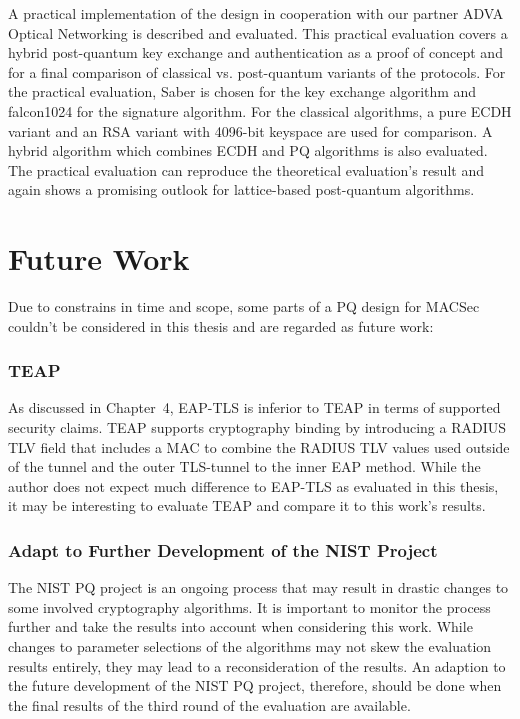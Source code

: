 A practical implementation of the design in cooperation with our partner ADVA Optical Networking is described and evaluated. This practical evaluation covers a hybrid post-quantum key exchange and authentication as a proof of concept and for a final comparison of classical vs. post-quantum variants of the protocols. For the practical evaluation, Saber is chosen for the key exchange algorithm and falcon1024 for the signature algorithm. For the classical algorithms, a pure \ac{ECDH} variant and an RSA variant with 4096-bit keyspace are used for comparison. A hybrid algorithm which combines ECDH and PQ algorithms is also evaluated. The practical evaluation can reproduce the theoretical evaluation's result and again shows a promising outlook for lattice-based post-quantum algorithms. 

\section*{Future Work}
Due to constrains in time and scope, some parts of a PQ design for MACSec couldn't be considered in this thesis and are regarded as future work:

\subsubsection*{TEAP}
    As discussed in Chapter~4, EAP-TLS is inferior to TEAP in terms of supported security claims. TEAP supports cryptography binding by introducing a RADIUS TLV field that includes a \ac{MAC} to combine the RADIUS TLV values used outside of the tunnel and the outer TLS-tunnel to the inner EAP method. While the author does not expect much difference to EAP-TLS as evaluated in this thesis, it may be interesting to evaluate TEAP and compare it to this work's results.

\subsubsection*{Adapt to Further Development of the NIST Project}
    The NIST PQ project is an ongoing process that may result in drastic changes to some involved cryptography algorithms. It is important to monitor the process further and take the results into account when considering this work. While changes to parameter selections of the algorithms may not skew the evaluation results entirely, they may lead to a reconsideration of the results. An adaption to the future development of the NIST PQ project, therefore, should be done when the final results of the third round of the evaluation are available. 

